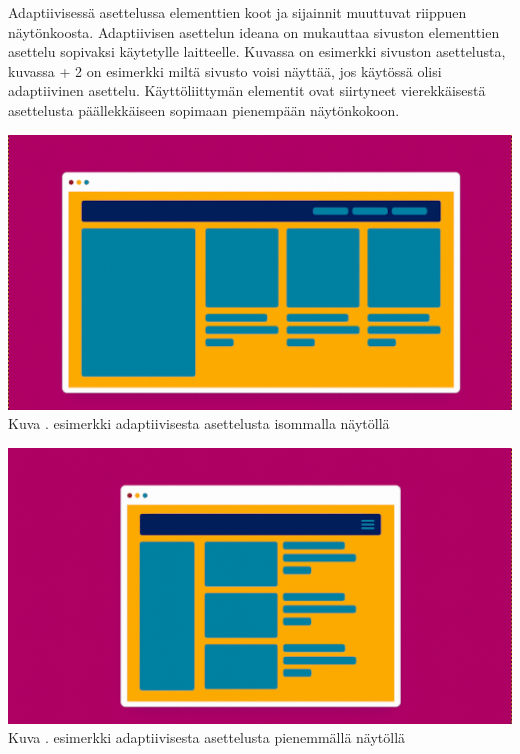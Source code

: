 \documentclass[11pt,a4paper,titlepage,oneside]{article}
\begin{document}
Adaptiivisessä asettelussa elementtien koot ja sijainnit muuttuvat riippuen näytönkoosta.
Adaptiivisen asettelun ideana on mukauttaa sivuston elementtien asettelu sopivaksi käytetylle laitteelle.
Kuvassa \nextImageCount {} on esimerkki sivuston asettelusta, kuvassa {\the\numexpr \theimgCounter + 2 } on esimerkki miltä sivusto voisi näyttää, jos käytössä olisi adaptiivinen asettelu.
Käyttöliittymän elementit ovat siirtyneet vierekkäisestä asettelusta päällekkäiseen sopimaan pienempään näytönkokoon.
\medskip


\bigskip
\includegraphics[width = 15cm]{src/public/oppar/adaptiveBig.png}\\
Kuva \getImgCount {}. esimerkki adaptiivisesta asettelusta isommalla näytöllä 
 
\bigskip

\includegraphics[width = 15cm]{src/public/oppar/adaptivesmall.png}\\
Kuva \getImgCount {}. esimerkki adaptiivisesta asettelusta pienemmällä näytöllä
\end{document}
